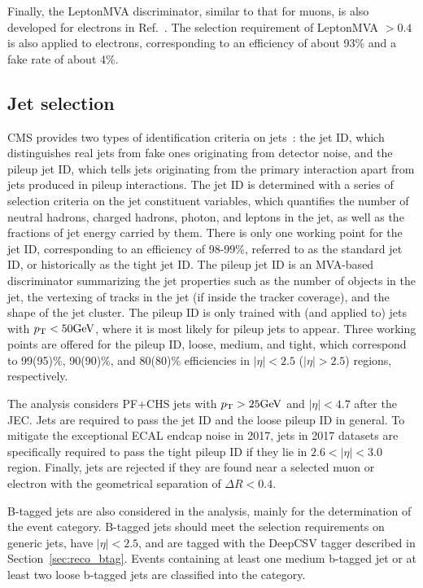 Finally, the LeptonMVA discriminator, similar to that for muons, is also developed for electrons in Ref.~\cite{PhysRevLett.122.132003}. 
The selection requirement of LeptonMVA $> 0.4$ is also applied to electrons, 
corresponding to an efficiency of about 93\% and a fake rate of about 4\%.

\subsection{Jet selection}\label{sec:sel_jet}

CMS provides two types of identification criteria on jets~\cite{Sirunyan_2020}: the jet ID, which distinguishes real jets from fake ones originating from detector noise,
and the pileup jet ID, which tells jets originating from the primary interaction apart from jets produced in pileup interactions.
The jet ID is determined with a series of selection criteria on the jet constituent variables,
which quantifies the number of neutral hadrons, charged hadrons, photon, and leptons in the jet, 
as well as the fractions of jet energy carried by them.
There is only one working point for the jet ID, corresponding to an efficiency of 98-99\%, referred to as the standard jet ID, or historically as the tight jet ID.
The pileup jet ID is an MVA-based discriminator summarizing the jet properties such as the number of objects in the jet, 
the vertexing of tracks in the jet (if inside the tracker coverage), and the shape of the jet cluster.
The pileup ID is only trained with (and applied to) jets with $p_{\mathrm{T}} < 50 \mbox{GeV}$, where it is most likely for pileup jets to appear.
Three working points are offered for the pileup ID, loose, medium, and tight, 
which correspond to 99(95)\%, 90(90)\%, and 80(80)\% efficiencies in $|\eta| < 2.5$ ($|\eta| > 2.5$) regions, respectively.

The \hmm analysis considers PF+CHS jets with $p_{\mathrm{T}} > 25 \mbox{GeV}$ and $|\eta| < 4.7$ after the JEC. 
Jets are required to pass the jet ID and the loose pileup ID in general.
To mitigate the exceptional ECAL endcap noise in 2017,
jets in 2017 datasets are specifically required to pass the tight pileup ID if they lie in $2.6 < |\eta| < 3.0$ region.
Finally, jets are rejected if they are found near a selected muon or electron with the geometrical separation of $\Delta{}R < 0.4$.

B-tagged jets are also considered in the \hmm analysis, mainly for the determination of the \ttH event category.
B-tagged jets should meet the selection requirements on generic jets, have $|\eta| < 2.5$, and are tagged with the DeepCSV tagger described in Section~\ref{sec:reco_btag}.
Events containing at least one medium b-tagged jet or at least two loose b-tagged jets are classified into the \ttH category.